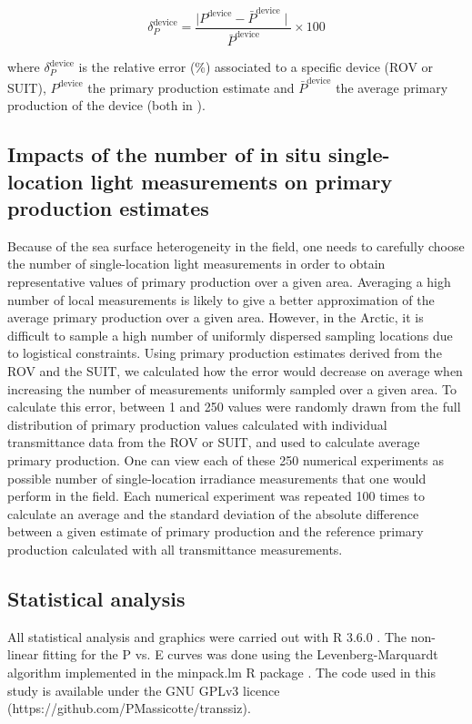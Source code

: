 \begin{linenomath*}
    \begin{equation}
		\delta_P^{\text{device}} = \frac{\mid P^{\text{device}} - \bar{P}^{\text{device}} \mid}{\bar{P}^{\text{device}}} \times 100
	\end{equation}
\end{linenomath*}

where $\delta_P^{\text{device}}$ is the relative error (\%) associated to a specific device (ROV or SUIT), $P^{\text{device}}$ the primary production estimate and $\bar{P}^{\text{device}}$ the average primary production of the device (both in \dailypp{}).

\subsection{Impacts of the number of in situ single-location light  measurements on primary production estimates}

Because of the sea surface heterogeneity in the field, one needs to carefully choose the number of single-location light measurements in order to obtain representative values of primary production over a given area. Averaging a high number of local measurements is likely to give a better approximation of the average primary production over a given area. However, in the Arctic, it is difficult to sample a high number of uniformly dispersed sampling locations due to logistical constraints. Using primary production estimates derived from the ROV and the SUIT, we calculated how the error would decrease on average when increasing the number of measurements uniformly sampled over a given area. To calculate this error, between 1 and 250 values were randomly drawn from the full distribution of primary production values calculated with individual transmittance data from the ROV or SUIT, and used to calculate average primary production. One can view each of these 250 numerical experiments as possible number of single-location irradiance  measurements that one would perform in the field. Each numerical experiment was repeated 100 times to calculate an average and the standard deviation of the absolute difference between a given estimate of primary production and the reference primary production calculated with all transmittance measurements.

\subsection{Statistical analysis}

All statistical analysis and graphics were carried out with R 3.6.0 \citep{RCoreTeam2019}. The non-linear fitting for the P vs. E curves was done using the Levenberg-Marquardt algorithm implemented in the minpack.lm R package \citep{Elzhov2013}. The code used in this study is available under the GNU GPLv3 licence (https://github.com/PMassicotte/transsiz).